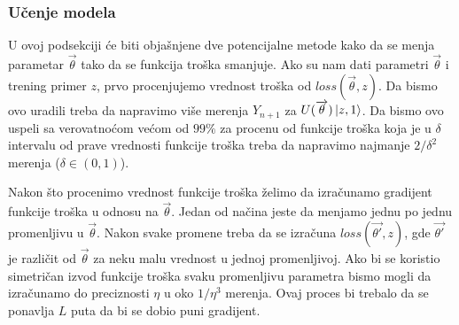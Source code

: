 \documentclass[12pt, letterpaper, oneside]{article}
\begin{document}
\subsubsection{Učenje modela}
U ovoj podsekciji će biti objašnjene dve potencijalne metode kako da se menja parametar $\overrightarrow{\theta}$ tako da se funkcija troška smanjuje.
Ako su nam dati parametri $\overrightarrow{\theta}$ i trening primer $z$, prvo procenjujemo vrednost troška od $\mathit{loss}(\overrightarrow{\theta},z)$.
Da bismo ovo uradili treba da napravimo više merenja $Y_{n+1}$ za $U(\overrightarrow{\theta})\Ket{z,1}$.
Da bismo ovo uspeli sa verovatnoćom većom od $99\%$ za procenu od funkcije troška koja je u $\delta$ intervalu od prave vrednosti funkcije troška
treba da napravimo najmanje $2/\delta^2$ merenja ($\delta \in (0,1)$).

Nakon što procenimo vrednost funkcije troška želimo da izračunamo gradijent funkcije troška u odnosu na $\overrightarrow{\theta}$.
Jedan od načina jeste da menjamo jednu po jednu promenljivu u $\overrightarrow{\theta}$. Nakon svake promene treba da se izračuna
$\mathit{loss}(\overrightarrow{\theta'},z)$, gde $\overrightarrow{\theta'}$ je različit od $\overrightarrow{\theta}$ za neku malu vrednost u jednoj promenljivoj.
Ako bi se koristio simetričan izvod funkcije troška svaku promenljivu parametra bismo mogli da izračunamo do preciznosti $\eta$ u oko $1/\eta^3$ merenja.
Ovaj proces bi trebalo da se ponavlja $L$ puta da bi se dobio puni gradijent.
\end{document}
